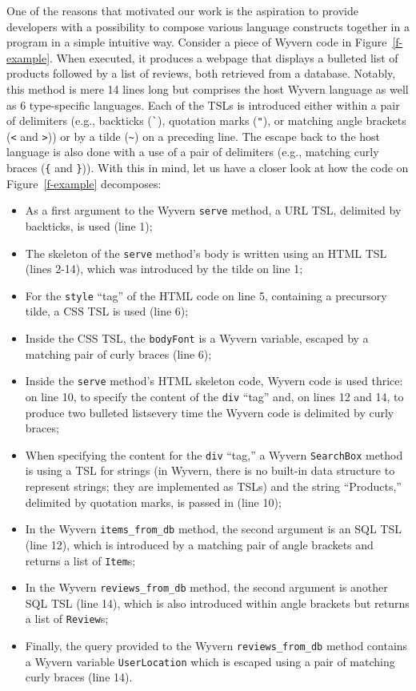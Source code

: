 One of the reasons that motivated our work is the aspiration to provide developers with a possibility to compose various language constructs together in a program in a simple intuitive way. Consider a piece of Wyvern code in Figure~\ref{f-example}. When executed, it produces a webpage that displays a bulleted list of products followed by a list of reviews, both retrieved from a database. Notably, this method is mere 14 lines long but comprises the host Wyvern language as well as 6 type-specific languages. Each of the TSLs is introduced either within a pair of delimiters (e.g., backticks (\lstinline{`}), quotation marks (\lstinline{"}), or matching angle brackets (\lstinline{<} and \lstinline{>})) or by a tilde (\lstinline{~}) on a preceding line. The escape back to the host language is also done with a use of a pair of delimiters (e.g., matching curly braces (\lstinline|{| and \lstinline|}|)). With this in mind, let us have a closer look at how the code on Figure~\ref{f-example} decomposes:

\begin{itemize}
\item As a first argument to the Wyvern \lstinline{serve} method, a URL TSL, delimited by backticks, is used (line 1);
\item The skeleton of the \lstinline{serve} method's body is written using an HTML TSL (lines 2-14), which was introduced by the tilde on line 1;
\item For the \lstinline{style} ``tag'' of the HTML code on line 5, containing a precursory tilde, a CSS TSL is used (line 6);
\item Inside the CSS TSL, the \lstinline{bodyFont} is a Wyvern variable, escaped by a matching pair of curly braces (line 6);
\item Inside the \lstinline{serve} method's HTML skeleton code, Wyvern code is used thrice: on line 10, to specify the content of the \lstinline{div} ``tag'' and, on lines 12 and 14, to produce two bulleted lists\textemdash every time the Wyvern code is delimited by curly braces;
\item When specifying the content for the \lstinline{div} ``tag,'' a Wyvern \lstinline{SearchBox} method is using a TSL for strings (in Wyvern, there is no built-in data structure to represent strings; they are implemented as TSLs) and the string ``Products,'' delimited by quotation marks, is passed in (line 10);
\item In the Wyvern \lstinline{items_from_db} method, the second argument is an SQL TSL (line 12), which is introduced by a matching pair of angle brackets and returns a list of \lstinline{Item}s;
\item In the Wyvern \lstinline{reviews_from_db} method, the second argument is another SQL TSL (line 14), which is also introduced within angle brackets but returns a list of \lstinline{Review}s;
\item Finally, the query provided to the Wyvern \lstinline{reviews_from_db} method contains a Wyvern variable \lstinline{UserLocation} which is escaped using a pair of matching curly braces (line 14).
\end{itemize}

